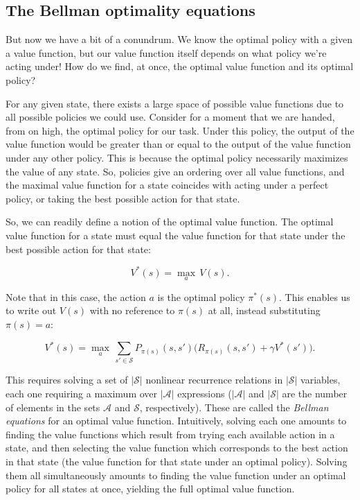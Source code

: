 \documentclass[12pt]{article}
\begin{document}
\subsection{The Bellman optimality equations}

But now we have a bit of a conundrum. We know the optimal policy with a given a value function, but our value function itself depends on what policy we're acting under! How do we find, at once, the optimal value function and its optimal policy?

For any given state, there exists a large space of possible value functions due to all possible policies we could use. Consider for a moment that we are handed, from on high, the optimal policy for our task. Under this policy, the output of the value function would be greater than or equal to the output of the value function under any other policy. This is because the optimal policy necessarily maximizes the value of any state. So, policies give an ordering over all value functions, and the maximal value function for a state coincides with acting under a perfect policy, or taking the best possible action for that state.

So, we can readily define a notion of the optimal value function. The optimal value function for a state must equal the value function for that state under the best possible action for that state:

\begin{equation}
V^*(s) = \underset{a}{\max} \, V(s).
\end{equation}

Note that in this case, the action $a$ is the optimal policy $\pi^*(s)$. This enables us to write out $V(s)$ with no reference to $\pi(s)$ at all, instead substituting $\pi(s) = a$:

\begin{equation}
V^*(s) = \underset{a}{\max} \, \sum_{s' \in \mathscr{S}} P_{\pi(s)}(s, s') \Big(R_{\pi(s)}(s, s') + \gamma V^*(s')\Big).
\end{equation}

This requires solving a set of $|\mathscr{S}|$ nonlinear recurrence relations in $|\mathscr{S}|$ variables\footnotemark, each one requiring a maximum over $|\mathscr{A}|$ expressions ($|\mathscr{A}|$ and $|\mathscr{S}|$ are the number of elements in the sets $\mathscr{A}$ and $\mathscr{S}$, respectively). These are called the \emph{Bellman equations} for an optimal value function. Intuitively, solving each one amounts to finding the value functions which result from trying each available action in a state, and then selecting the value function which corresponds to the best action in that state (the value function for that state under an optimal policy). Solving them all simultaneously amounts to finding the value function under an optimal policy for all states at once, yielding the full optimal value function.
\end{document}

